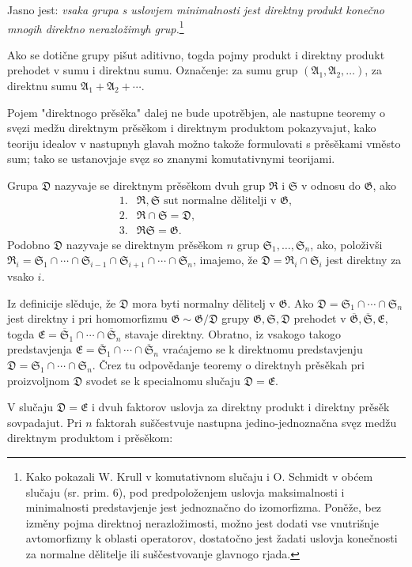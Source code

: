 \documentclass[11pt]{article}
\providecommand{\mG}{\mathfrak{G}}
\providecommand{\mA}{\mathfrak{A}}
\providecommand{\mE}{\mathfrak{E}}
\providecommand{\mD}{\mathfrak{D}}
\providecommand{\mR}{\mathfrak{R}}
\providecommand{\mS}{\mathfrak{S}}
\begin{document}
Jasno jest: \emph{vsaka grupa s uslovjem minimalnosti jest direktny produkt konečno mnogih direktno nerazložimyh grup.}\footnote{Kako pokazali W. Krull v komutativnom slučaju i O. Schmidt v obćem slučaju (sr. prim. 6), pod predpoloženjem uslovja maksimalnosti i minimalnosti predstavjenje jest jednoznačno do izomorfizma. Poněže, bez izměny pojma direktnoj nerazložimosti, možno jest dodati vse vnutrišnje avtomorfizmy k oblasti operatorov, dostatočno jest žadati uslovja konečnosti za normalne dělitelje ili suščestvovanje glavnogo rjada.}

Ako se dotične grupy pišut aditivno, togda pojmy produkt i direktny produkt prehodet v sumu i direktnu sumu. Označenje: za sumu grup $(\mA_1,\mA_2,\ldots)$, za direktnu sumu $\mA_1+\mA_2+\cdots$.

Pojem "direktnogo prěsěka" dalej ne bude upotrěbjen, ale nastupne teoremy o svęzi medžu direktnym prěsěkom i direktnym produktom pokazyvajut, kako teoriju idealov v nastupnyh glavah možno takože formulovati s prěsěkami vměsto sum; tako se ustanovjaje svęz so znanymi komutativnymi teorijami.

Grupa $\mD$ nazyvaje se direktnym prěsěkom dvuh grup $\mR$ i $\mS$ v odnosu do $\mG$, ako
\[
\begin{array}{ll}
1.& \mR,\mS\text{ sut normalne dělitelji v }\mG,\\
2.& \mR\cap\mS=\mD,\\
3.& \mR\mS=\mG.
\end{array}
\]
Podobno $\mD$ nazyvaje se direktnym prěsěkom $n$ grup $\mS_1,\ldots,\mS_n$, ako, položivši $\mR_i=\mS_1\cap\cdots\cap\mS_{i-1}\cap\mS_{i+1}\cap\cdots\cap\mS_n$, imajemo, že $\mD=\mR_i\cap\mS_i$ jest direktny za vsako $i$.

Iz definicije slěduje, že $\mD$ mora byti normalny dělitelj v $\mG$. Ako $\mD=\mS_1\cap\cdots\cap\mS_n$ jest direktny i pri homomorfizmu $\mG\sim\mG/\mD$ grupy $\mG,\mS,\mD$ prehodet v $\overline{\mG},\overline{\mS},\mE$, togda $\mE=\overline{\mS}_1\cap\cdots\cap\overline{\mS}_n$ stavaje direktny. Obratno, iz vsakogo takogo predstavjenja $\mE=\overline{\mS}_1\cap\cdots\cap\overline{\mS}_n$ vraćajemo se k direktnomu predstavjenju $\mD=\mS_1\cap\cdots\cap\mS_n$. Črez tu odpovědanje teoremy o direktnyh prěsěkah pri proizvoljnom $\mD$ svodet se k specialnomu slučaju $\mD=\mE$.

V slučaju $\mD=\mE$ i dvuh faktorov uslovja za direktny produkt i direktny prěsěk sovpadajut. Pri $n$ faktorah suščestvuje nastupna jedino-jednoznačna svęz medžu direktnym produktom i prěsěkom:
\end{document}
